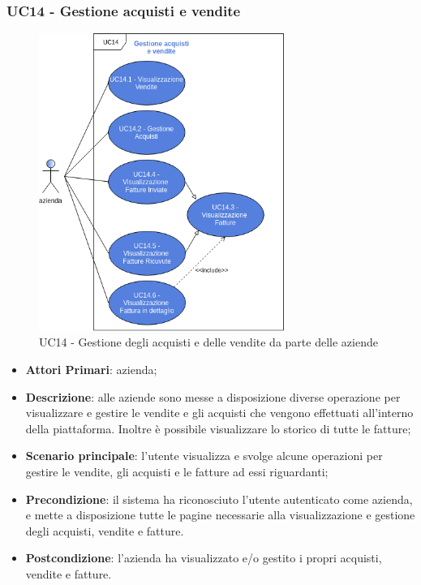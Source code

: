 \subsubsection{UC14 - Gestione acquisti e vendite}
\begin{figure}[h]
	\includegraphics[width=8cm]{res/images/UC14-Generale.png}
	\centering
	\caption{UC14 - Gestione degli acquisti e delle vendite da parte delle aziende}
\end{figure}
\begin{itemize}
	\item \textbf{Attori Primari}: azienda;
	\item \textbf{Descrizione}: alle aziende sono messe a disposizione diverse operazione per visualizzare e gestire le vendite e gli acquisti che vengono effettuati all'interno della piattaforma. Inoltre è possibile visualizzare lo storico di tutte le fatture;
	\item \textbf{Scenario principale}: l'utente visualizza e svolge alcune operazioni per gestire le vendite, gli acquisti e le fatture ad essi riguardanti;
	\item \textbf{Precondizione}: il sistema ha riconosciuto l'utente autenticato come azienda, e mette a disposizione tutte le pagine necessarie alla visualizzazione e gestione degli acquisti, vendite e fatture.
	\item \textbf{Postcondizione}: l'azienda ha visualizzato e/o gestito i propri acquisti, vendite e fatture.
\end{itemize} 
